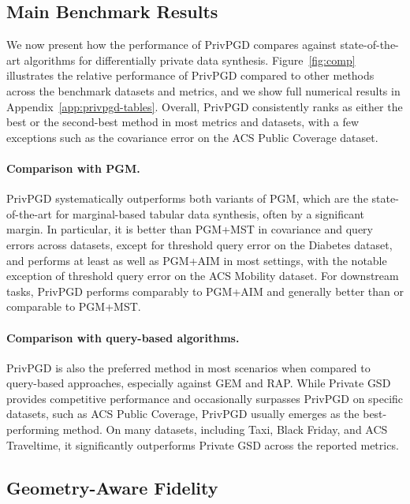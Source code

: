 \subsection{Main Benchmark Results}

We now present how the performance of PrivPGD compares against state-of-the-art algorithms for differentially private data synthesis. Figure~\ref{fig:comp} illustrates the relative performance of PrivPGD compared to other methods across the benchmark datasets and metrics, and we show full numerical results in Appendix~\ref{app:privpgd-tables}. Overall, PrivPGD consistently ranks as either the best or the second-best method in most metrics and datasets, with a few exceptions such as the covariance error on the ACS Public Coverage dataset.

\paragraph{Comparison with PGM.}
PrivPGD systematically outperforms both variants of PGM, which are the state-of-the-art for marginal-based tabular data synthesis, often by a significant margin. In particular, it is better than PGM+MST in covariance and query errors across datasets, except for threshold query error on the Diabetes dataset, and performs at least as well as PGM+AIM in most settings, with the notable exception of threshold query error on the ACS Mobility dataset. For downstream tasks, PrivPGD performs comparably to PGM+AIM and generally better than or comparable to PGM+MST.

\paragraph{Comparison with query-based algorithms.}
PrivPGD is also the preferred method in most scenarios when compared to query-based approaches, especially against GEM and RAP. While Private GSD provides competitive performance and occasionally surpasses PrivPGD on specific datasets, such as ACS Public Coverage, PrivPGD usually emerges as the best-performing method. On many datasets, including Taxi, Black Friday, and ACS Traveltime, it significantly outperforms Private GSD across the reported metrics.

\FloatBarrier

\subsection{Geometry-Aware Fidelity}

